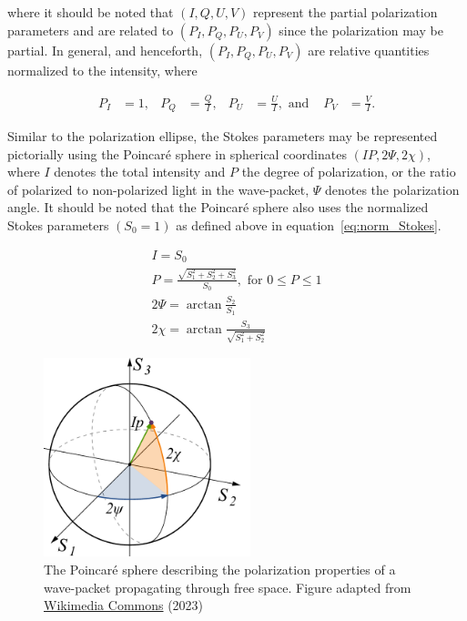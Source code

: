 \noindent where it should be noted that $(I, Q, U, V)$ represent the partial polarization parameters and are related to $(P_{I}, P_{Q}, P_{U}, P_{V})$ since the polarization may be partial. In general, and henceforth, $(P_{I}, P_{Q}, P_{U}, P_{V})$ are relative quantities normalized to the intensity, where

\begin{align}
    P_{I} & = 1, & P_{Q} & = \frac{Q}{I}, & P_{U} & = \frac{U}{I}, \text{   and } & P_{V} & = \frac{V}{I}.
    \label{eq:norm_Stokes}
\end{align}

Similar to the polarization ellipse, the Stokes parameters may be represented pictorially using the Poincar{\'e} sphere in spherical coordinates $(IP, 2 \Psi, 2 \chi)$, where $I$ denotes the total intensity and $P$ the degree of polarization, or the ratio of polarized to non-polarized light in the wave-packet, $\Psi$ denotes the polarization angle. It should be noted that the Poincar{\'e} sphere also uses the normalized Stokes parameters $(S_{0} = 1)$ as defined above in equation~\ref{eq:norm_Stokes}.

\begin{equation}
    \begin{gathered}
        I = S_{0} \\
        P = \frac{\sqrt{S_{1}^2 + S_{2}^2 + S_{3}^2}}{S_{0}}, \text{ for } 0 \leq P \leq 1 \\
        2 \Psi = \arctan \frac{S_{2}}{S_{1}} \\
        2 \chi = \arctan \frac{S_{3}}{\sqrt{S_{1}^{2} + S_{2}^{2}}}
    \end{gathered}
    \label{eq:poincare_coords}
\end{equation}

\begin{figure}[t]
    \centering
    \includegraphics[width=6cm]{figures/2_poincare_sphere.pdf}
    \caption{The Poincar{\'e} sphere describing the polarization properties of a wave-packet propagating through free space. Figure adapted from \protect\href{https://commons.wikimedia.org/wiki/File:Poincaré_sphere.svg}{Wikimedia Commons} (2023)}
    \label{fig:poincare}
\end{figure}
\prgph

